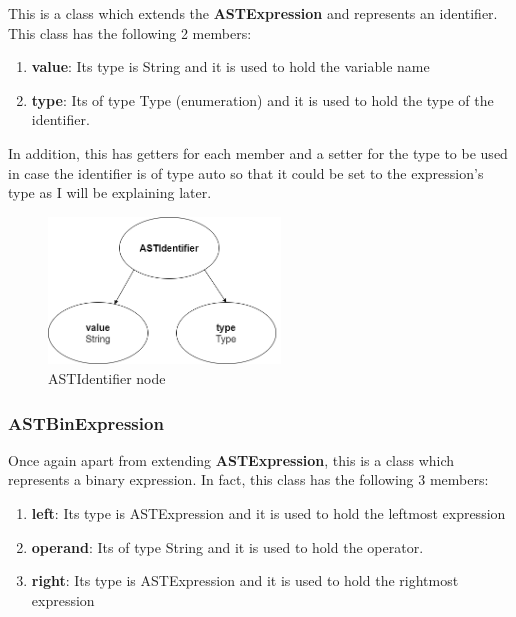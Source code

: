 \documentclass{article}
\begin{document}
					This is a class which extends the \textbf{ASTExpression} and represents an identifier. This class has the following 2 members: 
					\begin{enumerate}
					\item \textbf{value}: Its type is String and it is used to hold the variable name
					\item \textbf{type}: Its of type Type (enumeration) and it is used to hold the type of the identifier.
				
					\end{enumerate}
			In addition, this has getters for each member and a setter for the type to be used in case the identifier is of type auto so that it could be set to the expression's type as I will be explaining later.
					
					\begin{figure}[H]
					\centering
			 			\includegraphics[width=0.55\textwidth]{astidentifier.png}
			  			\caption{ASTIdentifier node}
			  			\label{fig:astidentifier}
					\end{figure}
					
					\subsubsection{ASTBinExpression}
					Once again apart from extending \textbf{ASTExpression}, this is a class which represents a binary expression. In fact, this class has the following 3 members:
					
					\begin{enumerate}
					\item \textbf{left}: Its type is ASTExpression and it is used to hold the leftmost expression
					\item \textbf{operand}: Its of type String and it is used to hold the operator.
					\item \textbf{right}: Its type is ASTExpression and it is used to hold the rightmost expression
					\end{enumerate}
				
\end{document}
